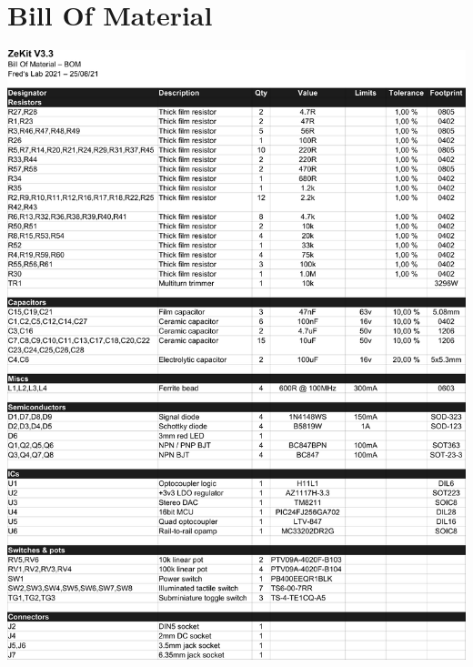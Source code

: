 \documentclass{scrartcl}
\begin{document}
\section{Bill Of Material}
\vspace{0.25cm}
\begin{center}
    \includegraphics[scale=0.72,origin=c]{assets/bom.png}
\end{center}
\end{document}
